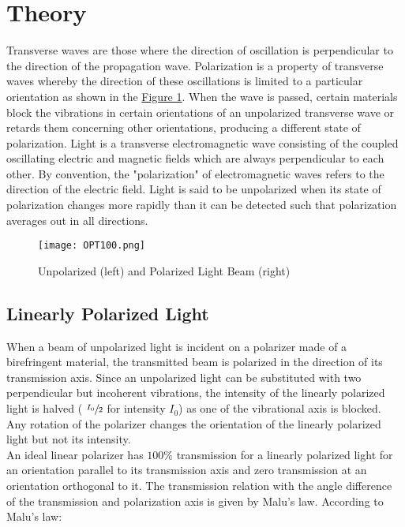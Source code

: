 \section{Theory}

	Transverse waves are those where the direction of oscillation is perpendicular to the direction of the propagation wave. Polarization is a property of transverse waves whereby the direction of these oscillations is limited to a particular orientation as shown in the \hyperref[fig:1]{Figure 1}. When the wave is passed, certain materials block the vibrations in certain orientations of an unpolarized transverse wave or retards them concerning other orientations, producing a different state of polarization. Light is a transverse electromagnetic wave consisting of the coupled oscillating electric and magnetic fields which are always perpendicular to each other. By convention, the "polarization" of electromagnetic waves refers to the direction of the electric field. Light is said to be unpolarized when its state of polarization changes more rapidly than it can be detected such that polarization averages out in all directions.
	\begin{figure}[H]
		\texttt{[image: OPT100.png]}
		\caption{Unpolarized (left) and Polarized Light Beam (right)}
		\label{fig:1}
	\end{figure}

	\subsection{Linearly Polarized Light}

		When a beam of unpolarized light is incident on a polarizer made of a birefringent material, the transmitted beam is polarized in the direction of its transmission axis. Since an unpolarized light can be substituted with two perpendicular but incoherent vibrations, the intensity of the linearly polarized light is halved ( $\sfrac{I_0}{2}$ for intensity $I_0$) as one of the vibrational axis is blocked. Any rotation of the polarizer changes the orientation of the linearly polarized light but not its intensity. \\

		An ideal linear polarizer has $100\%$ transmission for a linearly polarized light for an orientation parallel to its transmission axis and zero transmission at an orientation orthogonal to it. The transmission relation with the angle difference of the transmission and polarization axis is given by Malu's law. According to Malu's law:
		
